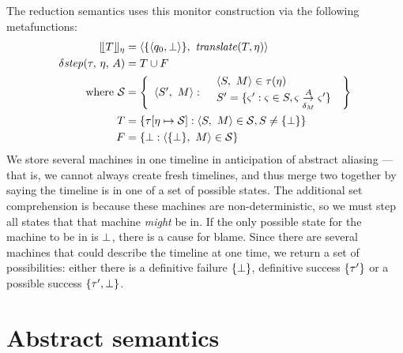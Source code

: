 \documentclass[preprint,onecolumn,9pt]{sigplanconf} %
\begin{document}
The reduction semantics uses this monitor construction via the following metafunctions:
\begin{align*}
  \compile{\mtcon}{\mtimeline} &= \npmsm{\setof{\pmsmstate{\pmsmq_0, \bot}}}{\translateeps(\mtcon, \mtimeline)} \\
  \sstep{\mTMons}{\mtimeline}{\mevent} &= T \cup F \\
    \text{where } {\mathcal S} &= \left\{
\ensuremath{
      \begin{array}{ll}
        \npmsm{S'}{\pmsmMachine} : &
        \begin{array}{l}
\npmsm{S}{\pmsmMachine} \in     \mTMons(\mtimeline) \\
 S' = \setbuild{\mstate'}{\mstate \in S, \mstate \pmsmstepd{\mevent}{\delta_\pmsmMachine} \mstate'}
\end{array}
      \end{array}
}\right\}
\\\phantom{\text{where }} T &= \setbuild{\mTMons[\mtimeline \mapsto {\mathcal S}]}{\npmsm{S}{\pmsmMachine} \in {\mathcal S}, S \neq \setof{\stfail}}
\\\phantom{\text{where }} F &= \setbuild{\stfail}{\npmsm{\setof{\stfail}}{\pmsmMachine} \in {\mathcal S}}
\end{align*}
We store several machines in one timeline in anticipation of abstract aliasing --- that is, we cannot always create fresh timelines, and thus merge two together by saying the timeline is in one of a set of possible states.
%
The additional set comprehension is because these machines are non-deterministic, so we must step all states that that machine \emph{might} be in.
%
If the only possible state for the machine to be in is $\bot$, there is a cause for blame.
%
Since there are several machines that could describe the timeline at one time, we return a set of possibilities: either there is a definitive failure $\{\bot\}$, definitive success $\{\tau'\}$ or a possible success $\{\tau', \bot\}$.

\section{Abstract semantics}
\end{document}
